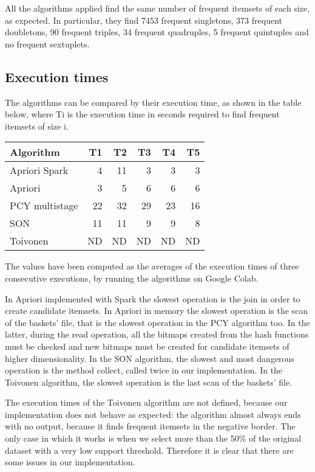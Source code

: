 \documentclass[conference,compsoc]{IEEEtran}
\theoremstyle{definition}
\begin{document}
All the algorithms applied find the same number of frequent itemsets of each size, as expected. In particular, they find 7453 frequent singletons, 373 frequent doubletons, 90 frequent triples, 34 frequent quadruples, 5 frequent quintuples and no frequent sextuplets.

\subsection{Execution times}

The algorithms can be compared by their execution time, as shown in the table below, where Ti is the execution time in seconds required to find frequent itemsets of size i. 

\begin{center}
\begin{tabular}{ |l|r|r|r|r|r| }
    \hline
    Algorithm & T1 & T2 & T3 & T4 & T5\\ 
    \hline\hline
    Apriori Spark & 4 & 11 & 3 & 3 & 3\\
    \hline
    Apriori & 3 & 5 & 6 & 6 & 6\\
    \hline
    PCY multistage & 22 & 32 & 29 & 23 & 16\\
    \hline
    SON & 11 & 11 & 9 & 9 & 8\\
    \hline
    Toivonen & ND & ND & ND & ND & ND\\
    \hline
\end{tabular}    
\end{center}

The values have been computed as the averages of the execution times of three consecutive executions, by running the algorithms on Google Colab.

In Apriori implemented with Spark the slowest operation is the join in order to create candidate itemsets. In Apriori in memory the slowest operation is the scan of the baskets' file, that is the slowest operation in the PCY algorithm too. In the latter, during the read operation, all the bitmaps created from the hash functions must be checked and new bitmaps must be created for candidate itemsets of higher dimensionality. In the SON algorithm, the slowest and most dangerous operation is the method collect, called twice in our implementation. In the Toivonen algorithm, the slowest operation is the last scan of the baskets' file. 

The execution times of the Toivonen algorithm are not defined, because our implementation does not behave as expected: the algorithm almost always ends with no output, because it finds frequent itemsets in the negative border. The only case in which it works is when we select more than the 50\% of the original dataset with a very low support threshold. Therefore it is clear that there are some issues in our implementation. 
\end{document}
